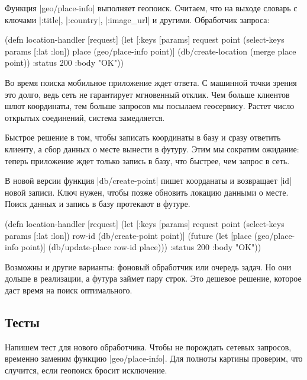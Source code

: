 Функция \spverb|geo/place-info| выполняет геопоиск. Считаем, что на выходе
словарь с ключами \spverb|:title|, \spverb|:country|, \spverb|:image_url| и
другими. Обработчик запроса:

\begin{english}
  \begin{clojure}
(defn location-handler [request]
  (let [{:keys [params]} request
        point (select-keys params [:lat :lon])
        place (geo/place-info point)]
    (db/create-location (merge place point))
    {:status 200 :body "OK"}))
  \end{clojure}
\end{english}

Во время поиска мобильное приложение ждет ответа. С машинной точки зрения это
долго, ведь сеть не гарантирует мгновенный отклик. Чем больше клиентов шлют
координаты, тем больше запросов мы посылаем геосервису. Растет число
открытых соединений, система замедляется.

Быстрое решение в том, чтобы записать координаты в базу и сразу ответить
клиенту, а сбор данных о месте вынести в футуру. Этим мы сократим ожидание:
теперь приложение ждет только запись в базу, что быстрее, чем запрос в сеть.

В новой версии функция \spverb|db/create-point| пишет коорданаты и возвращает
\spverb|id| новой записи. Ключ нужен, чтобы позже обновить локацию данными о
месте. Поиск данных и запись в базу протекают в футуре.

\begin{english}
  \begin{clojure}
(defn location-handler
  [request]
  (let [{:keys [params]} request
        point (select-keys params [:lat :lon])
        row-id (db/create-point point)]
    (future
      (let [place (geo/place-info point)]
        (db/update-place row-id place)))
    {:status 200 :body "OK"}))
  \end{clojure}
\end{english}

Возможны и другие варианты: фоновый обработчик или очередь задач. Но они дольше
в реализации, а футура займет пару строк. Это дешевое решение, которое даст
время на поиск оптимального.

\subsection{Тесты}

Напишем тест для нового обработчика. Чтобы не порождать сетевых запросов,
временно заменим функцию \spverb|geo/place-info|. Для полноты картины проверим,
что случится, если геопоиск бросит исключение.

